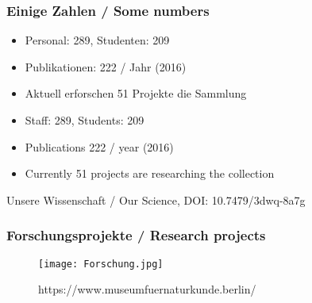 \documentclass[13pt]{beamer}
\begin{document}
\begin{frame}
  \frametitle{ Einige Zahlen / \textcolor{mfn_green}{Some numbers}}

  \begin{itemize}
  \item{Personal: 289, Studenten: 209}
  \item{Publikationen: 222 / Jahr (2016)}
  \item{Aktuell erforschen 51 Projekte die Sammlung}
  \end{itemize}
  
  \begin{itemize}
  \item{\textcolor{mfn_green}{Staff: 289, Students: 209}}
  \item{\textcolor{mfn_green}{Publications 222 / year (2016)}}
  \item{\textcolor{mfn_green}{Currently 51 projects are researching the collection}}
  \end{itemize}
  \bigskip
  \begin{center}\tiny{Unsere Wissenschaft / Our Science, DOI: 10.7479/3dwq-8a7g}\end{center}
\end{frame}

\begin{frame}
  \frametitle{Forschungsprojekte / \textcolor{mfn_green}{Research projects}}
  \begin{figure}
  \texttt{[image: Forschung.jpg]}
  \caption{https://www.museumfuernaturkunde.berlin/}
  \end{figure}
\end{frame}
\end{document}
